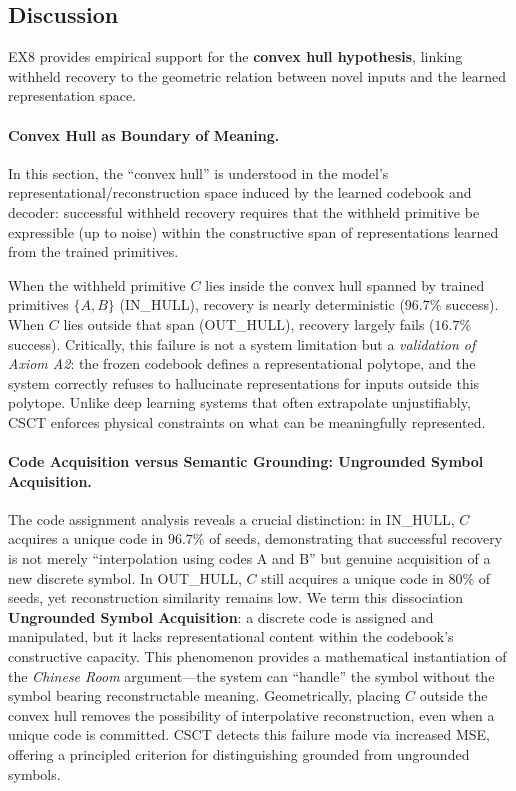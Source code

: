 \documentclass{article}
\begin{document}
\subsection{Discussion}

EX8 provides empirical support for the \textbf{convex hull hypothesis}, linking withheld recovery to the geometric relation between novel inputs and the learned representation space.

\paragraph{Convex Hull as Boundary of Meaning.}
In this section, the “convex hull” is understood in the model’s representational/reconstruction space induced by the learned codebook and decoder: successful withheld recovery requires that the withheld primitive be expressible (up to noise) within the constructive span of representations learned from the trained primitives.

When the withheld primitive $C$ lies inside the convex hull spanned by trained primitives $\{A, B\}$ (IN\_HULL), recovery is nearly deterministic ($96.7\%$ success).
When $C$ lies outside that span (OUT\_HULL), recovery largely fails ($16.7\%$ success).
Critically, this failure is not a system limitation but a \emph{validation of Axiom A2}: the frozen codebook defines a representational polytope, and the system correctly refuses to hallucinate representations for inputs outside this polytope.
Unlike deep learning systems that often extrapolate unjustifiably, CSCT enforces physical constraints on what can be meaningfully represented.

\paragraph{Code Acquisition versus Semantic Grounding: Ungrounded Symbol Acquisition.}
The code assignment analysis reveals a crucial distinction: in IN\_HULL, $C$ acquires a unique code in $96.7\%$ of seeds, demonstrating that successful recovery is not merely ``interpolation using codes A and B'' but genuine acquisition of a new discrete symbol.
In OUT\_HULL, $C$ still acquires a unique code in $80\%$ of seeds, yet reconstruction similarity remains low.
We term this dissociation \textbf{Ungrounded Symbol Acquisition}: a discrete code is assigned and manipulated, but it lacks representational content within the codebook's constructive capacity.
This phenomenon provides a mathematical instantiation of the \emph{Chinese Room} argument---the system can ``handle'' the symbol without the symbol bearing reconstructable meaning.
Geometrically, placing $C$ outside the convex hull removes the possibility of interpolative reconstruction, even when a unique code is committed.
CSCT detects this failure mode via increased MSE, offering a principled criterion for distinguishing grounded from ungrounded symbols.
\end{document}
